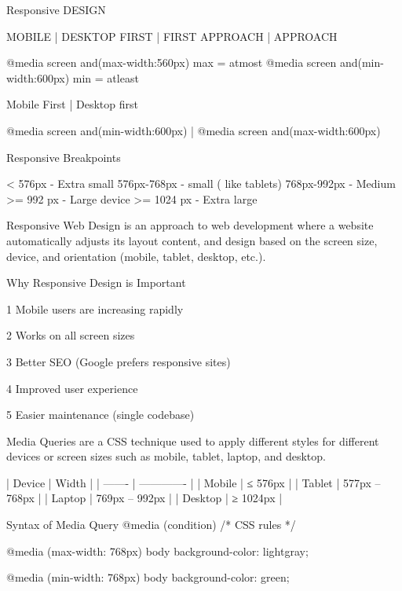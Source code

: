 Responsive DESIGN

MOBILE            |            DESKTOP
FIRST             |            FIRST
APPROACH          |            APPROACH


@media screen and(max-width:560px) {}                                                  max = atmost
@media screen and(min-width:600px) {}                                                  min = atleast



Mobile First                            |      Desktop first

@media screen and(min-width:600px) {}   |       @media screen and(max-width:600px) {}   



Responsive Breakpoints

< 576px         -      Extra small
576px-768px     -       small         ( like tablets)
768px-992px     -        Medium
>= 992 px       -       Large device
>= 1024 px      -      Extra large






Responsive Web Design is an approach to web development where a website automatically adjusts its layout
content, and design based on the screen size, device, and orientation (mobile, tablet, desktop, etc.).


Why Responsive Design is Important

1 Mobile users are increasing rapidly

2 Works on all screen sizes

3 Better SEO (Google prefers responsive sites)

4 Improved user experience

5 Easier maintenance (single codebase)


Media Queries are a CSS technique used to apply different styles for different devices
or screen sizes such as mobile, tablet, laptop, and desktop.

| Device  | Width         |
| ------- | ------------- |
| Mobile  | ≤ 576px       |
| Tablet  | 577px – 768px |
| Laptop  | 769px – 992px |
| Desktop | ≥ 1024px      |



Syntax of Media Query
@media (condition) {
  /* CSS rules */
}


@media (max-width: 768px) {
  body {
    background-color: lightgray;
  }
}


@media (min-width: 768px) {
  body {
    background-color: green;
  }
}
